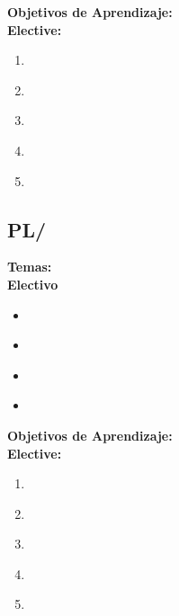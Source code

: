 \noindent \textbf{Objetivos de Aprendizaje:}\\
\noindent \textbf{Elective:}
\begin{enumerate}
	\setcounter{enumi}{0}
	\item \PLCodeGenerationLOIdentifyAllFor\xspace[\PLCodeGenerationLOIdentifyAllForLevel]\label{sec:BOK:PLCodeGenerationLOIdentifyAllFor}
	\item \PLCodeGenerationLOGenerateThe\xspace[\PLCodeGenerationLOGenerateTheLevel]\label{sec:BOK:PLCodeGenerationLOGenerateThe}
	\item \PLCodeGenerationLODiscussWhyRequires\xspace[\PLCodeGenerationLODiscussWhyRequiresLevel]\label{sec:BOK:PLCodeGenerationLODiscussWhyRequires}
	\item \PLCodeGenerationLODiscussWhyLimits\xspace[\PLCodeGenerationLODiscussWhyLimitsLevel]\label{sec:BOK:PLCodeGenerationLODiscussWhyLimits}
	\item \PLCodeGenerationLODiscussOpportunities\xspace[\PLCodeGenerationLODiscussOpportunitiesLevel]\label{sec:BOK:PLCodeGenerationLODiscussOpportunities}
\end{enumerate}


\subsection{PL/\PLRuntimeSystems}\label{sec:BOK:PLRuntimeSystems}
\noindent \textbf{Temas:}\\
\noindent \textbf{Electivo}
\begin{itemize}
	\item \PLRuntimeSystemsTopicDynamic\label{sec:BOK:PLRuntimeSystemsTopicDynamic}
	\item \PLRuntimeSystemsTopicData\label{sec:BOK:PLRuntimeSystemsTopicData}
	\item \PLRuntimeSystemsTopicJust\label{sec:BOK:PLRuntimeSystemsTopicJust}
	\item \PLRuntimeSystemsTopicOther\label{sec:BOK:PLRuntimeSystemsTopicOther}
\end{itemize}


\noindent \textbf{Objetivos de Aprendizaje:}\\
\noindent \textbf{Elective:}
\begin{enumerate}
	\setcounter{enumi}{0}
	\item \PLRuntimeSystemsLOCompareTheDifferent\xspace[\PLRuntimeSystemsLOCompareTheDifferentLevel]\label{sec:BOK:PLRuntimeSystemsLOCompareTheDifferent}
	\item \PLRuntimeSystemsLODiscussBenefits\xspace[\PLRuntimeSystemsLODiscussBenefitsLevel]\label{sec:BOK:PLRuntimeSystemsLODiscussBenefits}
	\item \PLRuntimeSystemsLOExplainTheMetadata\xspace[\PLRuntimeSystemsLOExplainTheMetadataLevel]\label{sec:BOK:PLRuntimeSystemsLOExplainTheMetadata}
	\item \PLRuntimeSystemsLODiscussAdvantages\xspace[\PLRuntimeSystemsLODiscussAdvantagesLevel]\label{sec:BOK:PLRuntimeSystemsLODiscussAdvantages}
	\item \PLRuntimeSystemsLOIdentifyTheBy\xspace[\PLRuntimeSystemsLOIdentifyTheByLevel]\label{sec:BOK:PLRuntimeSystemsLOIdentifyTheBy}
\end{enumerate}


